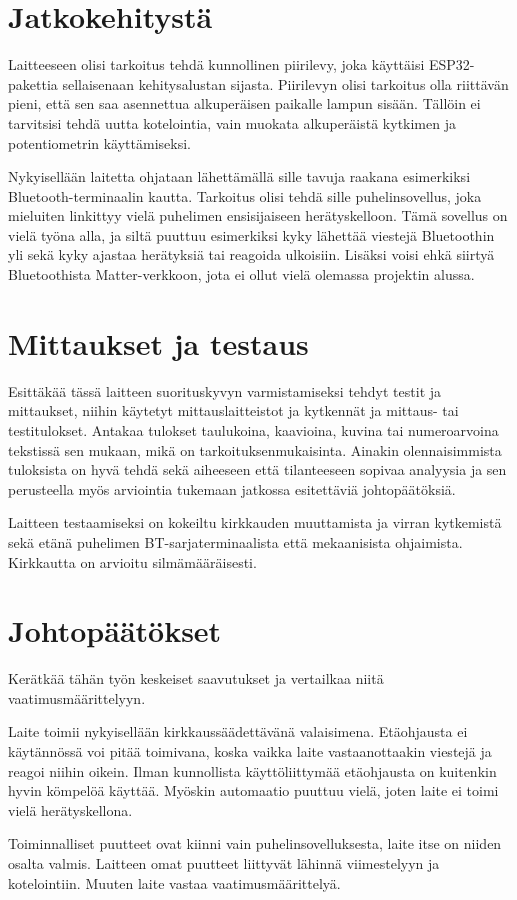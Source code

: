 \documentclass{article}
\begin{document}
\newpage
\section*{Jatkokehitystä}

Laitteeseen olisi tarkoitus tehdä kunnollinen piirilevy, joka käyttäisi ESP32-pakettia sellaisenaan kehitysalustan sijasta. Piirilevyn olisi tarkoitus olla riittävän pieni, että sen saa asennettua alkuperäisen paikalle lampun sisään. Tällöin ei tarvitsisi tehdä uutta kotelointia, vain muokata alkuperäistä kytkimen ja potentiometrin käyttämiseksi.

Nykyisellään laitetta ohjataan lähettämällä sille tavuja raakana esimerkiksi Bluetooth-terminaalin kautta. Tarkoitus olisi tehdä sille puhelinsovellus, joka mieluiten linkittyy vielä puhelimen ensisijaiseen herätyskelloon. Tämä sovellus on vielä työna alla, ja siltä puuttuu esimerkiksi kyky lähettää viestejä Bluetoothin yli sekä kyky ajastaa herätyksiä tai reagoida ulkoisiin. Lisäksi voisi ehkä siirtyä Bluetoothista Matter-verkkoon, jota ei ollut vielä olemassa projektin alussa.

\newpage
\section*{Mittaukset ja testaus}

Esittäkää tässä laitteen suorituskyvyn varmistamiseksi tehdyt testit ja mittaukset, niihin käytetyt mittauslaitteistot ja kytkennät ja mittaus- tai testitulokset. Antakaa tulokset taulukoina, kaavioina, kuvina tai numeroarvoina tekstissä sen mukaan, mikä on tarkoituksenmukaisinta. Ainakin olennaisimmista tuloksista on hyvä tehdä sekä aiheeseen että tilanteeseen sopivaa analyysia ja sen perusteella myös arviointia tukemaan jatkossa esitettäviä johtopäätöksiä.

Laitteen testaamiseksi on kokeiltu kirkkauden muuttamista ja virran kytkemistä sekä etänä puhelimen BT-sarjaterminaalista että mekaanisista ohjaimista. Kirkkautta on arvioitu silmämääräisesti.

\newpage
\section*{Johtopäätökset}

Kerätkää tähän työn keskeiset saavutukset ja vertailkaa niitä vaatimusmäärittelyyn.

Laite toimii nykyisellään kirkkaussäädettävänä valaisimena. Etäohjausta ei käytännössä voi pitää toimivana, koska vaikka laite vastaanottaakin viestejä ja reagoi niihin oikein. Ilman kunnollista käyttöliittymää etäohjausta on kuitenkin hyvin kömpelöä käyttää. Myöskin automaatio puuttuu vielä, joten laite ei toimi vielä herätyskellona.

Toiminnalliset puutteet ovat kiinni vain puhelinsovelluksesta, laite itse on niiden osalta valmis. Laitteen omat puutteet liittyvät lähinnä viimestelyyn ja kotelointiin. Muuten laite vastaa vaatimusmäärittelyä.

\newpage
\printbibliography
\end{document}
